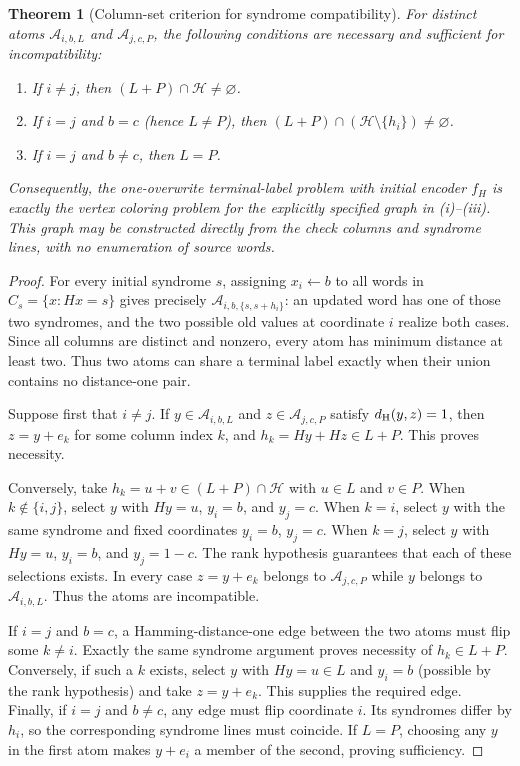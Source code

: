 \documentclass[11pt,a4paper]{article}
\newtheorem{theorem}{Theorem}[section]
\begin{document}
\begin{theorem}[Column-set criterion for syndrome compatibility]\label{thm:column-criterion}
For distinct atoms $\mathcal A_{i,b,L}$ and $\mathcal A_{j,c,P}$, the following conditions are necessary and sufficient for incompatibility:
\begin{enumerate}[label=(\roman*),leftmargin=2em]
\item If $i\ne j$, then $(L+P)\cap\mathscr H\ne\varnothing$.
\item If $i=j$ and $b=c$ (hence $L\ne P$), then $(L+P)\cap(\mathscr H\setminus\{h_i\})\ne\varnothing$.
\item If $i=j$ and $b\ne c$, then $L=P$.
\end{enumerate}
Consequently, the one-overwrite terminal-label problem with initial encoder $f_H$ is exactly the vertex coloring problem for the explicitly specified graph in (i)--(iii). This graph may be constructed directly from the check columns and syndrome lines, with no enumeration of source words.
\end{theorem}
\begin{proof}
For every initial syndrome $s$, assigning $x_i\leftarrow b$ to all words in $C_s=\{x:Hx=s\}$ gives precisely $\mathcal A_{i,b,\{s,s+h_i\}}$: an updated word has one of those two syndromes, and the two possible old values at coordinate $i$ realize both cases. Since all columns are distinct and nonzero, every atom has minimum distance at least two. Thus two atoms can share a terminal label exactly when their union contains no distance-one pair.

Suppose first that $i\ne j$. If $y\in\mathcal A_{i,b,L}$ and $z\in\mathcal A_{j,c,P}$ satisfy $d_{\rm H}(y,z)=1$, then $z=y+e_k$ for some column index $k$, and $h_k=Hy+Hz\in L+P$. This proves necessity.

Conversely, take $h_k=u+v\in(L+P)\cap\mathscr H$ with $u\in L$ and $v\in P$. When $k\notin\{i,j\}$, select $y$ with $Hy=u$, $y_i=b$, and $y_j=c$. When $k=i$, select $y$ with the same syndrome and fixed coordinates $y_i=b$, $y_j=c$. When $k=j$, select $y$ with $Hy=u$, $y_i=b$, and $y_j=1-c$. The rank hypothesis guarantees that each of these selections exists. In every case $z=y+e_k$ belongs to $\mathcal A_{j,c,P}$ while $y$ belongs to $\mathcal A_{i,b,L}$. Thus the atoms are incompatible.

If $i=j$ and $b=c$, a Hamming-distance-one edge between the two atoms must flip some $k\ne i$. Exactly the same syndrome argument proves necessity of $h_k\in L+P$. Conversely, if such a $k$ exists, select $y$ with $Hy=u\in L$ and $y_i=b$ (possible by the rank hypothesis) and take $z=y+e_k$. This supplies the required edge. Finally, if $i=j$ and $b\ne c$, any edge must flip coordinate $i$. Its syndromes differ by $h_i$, so the corresponding syndrome lines must coincide. If $L=P$, choosing any $y$ in the first atom makes $y+e_i$ a member of the second, proving sufficiency.
\end{proof}
\end{document}
